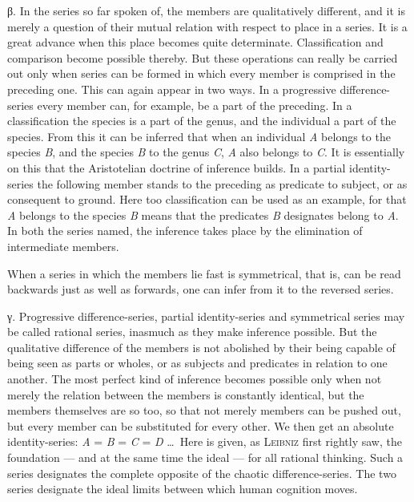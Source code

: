 \documentclass[12pt]{book}
\begin{document}
β. In the series so far spoken of, the members are qualitatively different, and
it is merely a question of their mutual relation with respect to place in a
series. It is a great advance when this place becomes quite determinate.
Classification and comparison become possible thereby. But these operations can
really be carried out only when series can be formed in which every member is
comprised in the preceding one. This can again appear in two ways. In a
progressive difference-series every member can, for example, be a part of the
preceding. In a classification the species is a part of the genus, and the
individual a part of the species. From this it can be inferred that when an
individual \textit{A} belongs to the species \textit{B}, and the species
\textit{B} to the genus \textit{C}, \textit{A} also belongs to \textit{C}. It is
essentially on this that the Aristotelian doctrine of inference builds. In a
partial identity-series the following member stands to the preceding as
predicate to subject, or as consequent to ground. Here too classification can be
used as an example, for that \textit{A} belongs to the species \textit{B} means
that the predicates \textit{B} designates belong to \textit{A}. In both the
series named, the inference takes place by the elimination of intermediate
members.

When a series in which the members lie fast is symmetrical, that is, can be read
backwards just as well as forwards, one can infer from it to the reversed
series.

γ. Progressive difference-series, partial identity-series and symmetrical series
may be called rational series, inasmuch as they make inference possible. But the
qualitative difference of the members is not abolished by their being capable of
being seen as parts or wholes, or as subjects and predicates in relation to one
another. The most perfect kind of inference becomes possible only when not
merely the relation between the members is constantly identical, but the members
themselves are so too, so that not merely members can be pushed out, but every
member can be substituted for every other. We then get an absolute
identity-series: \textit{A} = \textit{B} = \textit{C} = \textit{D} \dots\ Here
is given, as \textsc{Leibniz} first rightly saw, the foundation --- and at the
same time the ideal --- for all rational thinking. Such a series designates the
complete opposite of the chaotic difference-series. The two series designate the
ideal limits between which human cognition moves.
\end{document}
